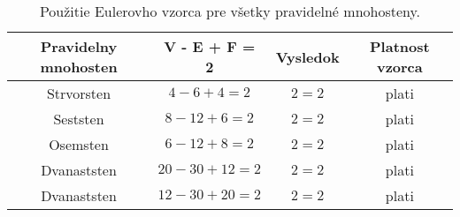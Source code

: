 	\begin{table}
		\caption{Použitie Eulerovho vzorca pre všetky pravidelné mnohosteny.}
		\label{tab 1}
		\begin{tabular}{|c|c|c|c|}
			\hline
			\textbf{Pravidelny mnohosten}&\textbf{V - E + F = 2}&\textbf{Vysledok}&\textbf{Platnost vzorca}\\ \hline
			Strvorsten&$4 - 6 + 4 = 2$&$2 = 2$&{\color{green}plati} \\ \hline
			Seststen&$8 - 12 + 6 = 2$&$2 = 2$&{\color{green}plati} \\ \hline
			Osemsten&$6 - 12 + 8 = 2$&$2 = 2$&{\color{green}plati} \\ \hline
			Dvanaststen&$20 - 30 + 12 = 2$&$2 = 2$&{\color{green}plati} \\ \hline
			Dvanaststen&$12 - 30 + 20 = 2$&$2 = 2$&{\color{green}plati} \\ \hline
		\end{tabular}
	\end{table}